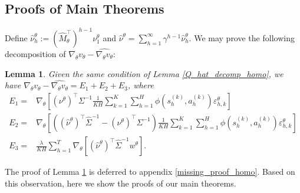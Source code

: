\documentclass{article}
\newtheorem{lemma}{Lemma}[section]
\numberwithin{equation}{section}
\begin{document}
\subsection{Proofs of Main Theorems}
Define $\widehat{\nu}^\theta_h:=\left(\widehat{M}_\theta^\top\right)^{h-1}\nu_1^\theta$ and $\widehat{\nu}^\theta = \sum_{h=1}^\infty \gamma^{h-1}\widehat{\nu}_h^\theta$. We may prove the following decomposition of $\nabla_\theta v_\theta-\widehat{\nabla_\theta v_\theta}$:
\begin{lemma}
\label{error_decomp_homo}
Given the same condition of Lemma \ref{Q_hat_decomp_homo}, we have $\nabla_\theta v_\theta-\widehat{\nabla_\theta v_\theta}=E_1+E_2+E_3$, where 
\begin{align*}
    E_1=&\nabla_\theta\left[\left(\nu^\theta\right)^\top\Sigma^{-1}\frac{1}{KH}\sum_{k=1}^K\sum_{h=1}^H\phi\left(s_h^{(k)},a_h^{(k)}\right)\varepsilon_{h,k}^\theta\right]\\
    E_2=&\nabla_\theta\left[\left(\left(\widehat{\nu}^\theta\right)^\top\widehat{\Sigma}^{-1}-\left(\nu^\theta\right)^\top\Sigma^{-1}\right)\frac{1}{KH}\sum_{k=1}^K\sum_{h=1}^H\phi\left(s_h^{(k)},a_h^{(k)}\right)\varepsilon_{h,k}^\theta\right]\\
    E_3=&\frac{\lambda}{KH}\sum_{h=1}^T\nabla_\theta\left[\left(\widehat{\nu}^\theta\right)^\top\widehat{\Sigma}^{-1}w^\theta\right].
\end{align*}
\end{lemma}
The proof of Lemma \ref{error_decomp_homo} is deferred to appendix \ref{missing_proof_homo}. Based on this observation, here we show the proofs of our main theorems. 
\end{document}
